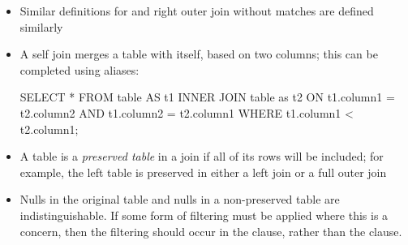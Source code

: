 \documentclass[a4paper]{article}
\begin{document}
\begin{itemize}
    \item Similar definitions for  and right outer join without matches are defined similarly
    \item A self join merges a table with itself, based on two columns; this can be completed using aliases:
\begin{sql}
SELECT * FROM table AS t1
INNER JOIN table as t2
ON t1.column1 = t2.column2
AND t1.column2 = t2.column1
WHERE t1.column1 < t2.column1;
\end{sql}
\item A table is a \emph{preserved table} in a join if all of its rows will be included; for example, the left table is preserved in either a left join or a full outer join
\item Nulls in the original table and nulls in a non-preserved table are indistinguishable. If some form of filtering must be applied where this is a concern, then the filtering should occur in the  clause, rather than the  clause.
\end{itemize}
\end{document}
